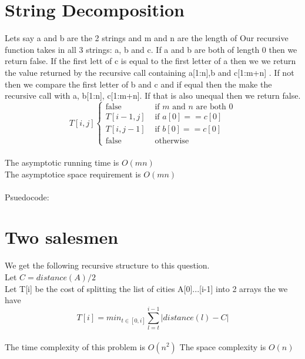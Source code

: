 \documentclass{article}
\begin{document}
\section{String Decomposition}
\label{sec:String Decomposition}
    Lets say a and b are the 2 strings and m and n are the length of
    Our recursive function takes in all 3 strings: a, b and c. If a and b are both of length 0 then we return false. If the first lett of c is equal to the first letter of a then we we return the value returned by the recursive call containing a[1:n],b and c[1:m+n] .
    If not then we compare the first letter of b and c and if equal then the make the recursive call with a, b[1:n], c[1:m+n]. If that is also unequal then we return false.
    \\
    \[
    T[i,j]
    \begin{cases}
        \text{false} &\text{ if }m \text{ and } n \text{ are both 0}\\
        T[i-1, j]&\text{ if }a[0] == c[0]\\
        T[i, j-1]&\text{ if }b[0] == c[0]\\
        \text{false} &\text{ otherwise}
    \end{cases}
    \]\\
    The asymptotic running time is $O(mn)$\\
    The asymptotice space requirement is $O(mn)$\\\\Psuedocode:

    

\section{Two salesmen}
\label{sec:Two salesmen}
    We get the following recursive structure to this question.\\
    Let $ C = distance(A)/2$ \\
    Let T[i] be the cost of splitting the list of cities A[0]...[i-1] into 2 arrays the we have
    \[T[i] = min_{t\in[0,i]}\sum_{l=t}^{i-1}|distance(l) - C|\]\\
    The time complexity of this problem is $O(n^2)$
    The space complexity is $O(n)$
\end{document}
